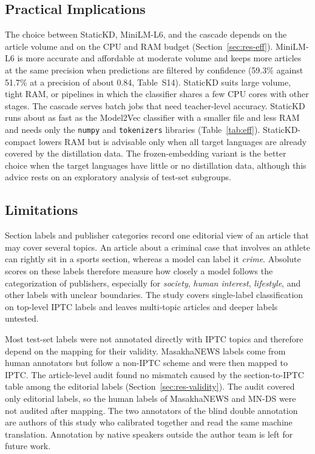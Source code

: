 \documentclass{ieeeaccess}
\begin{document}
\subsection{Practical Implications}
The choice between StaticKD, MiniLM-L6, and the cascade depends on the article volume and on the CPU and RAM budget (Section~\ref{sec:res-eff}). MiniLM-L6 is more accurate and affordable at moderate volume and keeps more articles at the same precision when predictions are filtered by confidence (59.3\% against 51.7\% at a precision of about 0.84, Table~S14). StaticKD suits large volume, tight RAM, or pipelines in which the classifier shares a few CPU cores with other stages. The cascade serves batch jobs that need teacher-level accuracy. StaticKD runs about as fast as the Model2Vec classifier with a smaller file and less RAM and needs only the \texttt{numpy} and \texttt{tokenizers} libraries (Table~\ref{tab:eff}). StaticKD-compact lowers RAM but is advisable only when all target languages are already covered by the distillation data. The frozen-embedding variant is the better choice when the target languages have little or no distillation data, although this advice rests on an exploratory analysis of test-set subgroups.

\subsection{Limitations}
\label{sec:limitations}
Section labels and publisher categories record one editorial view of an article that may cover several topics. An article about a criminal case that involves an athlete can rightly sit in a sports section, whereas a model can label it \emph{crime}. Absolute scores on these labels therefore measure how closely a model follows the categorization of publishers, especially for \emph{society}, \emph{human interest}, \emph{lifestyle}, and other labels with unclear boundaries. The study covers single-label classification on top-level IPTC labels and leaves multi-topic articles and deeper labels untested.

Most test-set labels were not annotated directly with IPTC topics and therefore depend on the mapping for their validity. MasakhaNEWS labels come from human annotators but follow a non-IPTC scheme and were then mapped to IPTC. The article-level audit found no mismatch caused by the section-to-IPTC table among the editorial labels (Section~\ref{sec:res-validity}). The audit covered only editorial labels, so the human labels of MasakhaNEWS and MN-DS were not audited after mapping. The two annotators of the blind double annotation are authors of this study who calibrated together and read the same machine translation. Annotation by native speakers outside the author team is left for future work.
\end{document}
